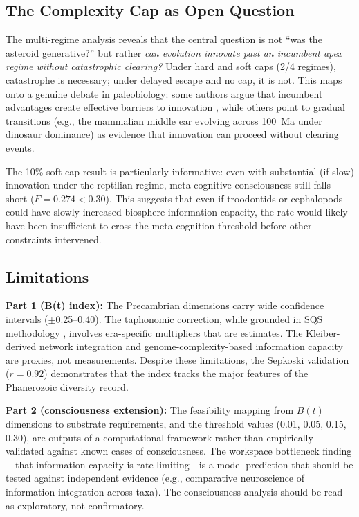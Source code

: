 \documentclass[10pt,letterpaper]{article}
\newcommand{\bt}{$B(t)$}
\begin{document}
\subsection*{The Complexity Cap as Open Question}

The multi-regime analysis reveals that the central question is not ``was
the asteroid generative?'' but rather \emph{can evolution innovate past an
incumbent apex regime without catastrophic clearing?} Under hard and soft
caps (2/4 regimes), catastrophe is necessary; under delayed escape and no
cap, it is not. This maps onto a genuine debate in paleobiology: some authors
argue that incumbent advantages create effective barriers to innovation
\cite{erwin2001}, while others point to gradual transitions (e.g., the
mammalian middle ear evolving across 100~Ma under dinosaur dominance) as
evidence that innovation can proceed without clearing events.

The 10\% soft cap result is particularly informative: even with substantial
(if slow) innovation under the reptilian regime, meta-cognitive consciousness
still falls short ($F = 0.274 < 0.30$). This suggests that even if troodontids
or cephalopods could have slowly increased biosphere information capacity,
the rate would likely have been insufficient to cross the meta-cognition
threshold before other constraints intervened.

\subsection*{Limitations}

\textbf{Part 1 (B(t) index):} The Precambrian dimensions carry wide
confidence intervals ($\pm$0.25--0.40). The taphonomic correction,
while grounded in SQS methodology \cite{alroy2010}, involves era-specific
multipliers that are estimates. The Kleiber-derived network integration
and genome-complexity-based information capacity are proxies, not measurements.
Despite these limitations, the Sepkoski validation ($r = 0.92$) demonstrates
that the index tracks the major features of the Phanerozoic diversity record.

\textbf{Part 2 (consciousness extension):} The feasibility mapping from
\bt{} dimensions to substrate requirements, and the threshold values
(0.01, 0.05, 0.15, 0.30), are outputs of a computational framework rather
than empirically validated against known cases of consciousness. The workspace
bottleneck finding---that information capacity is rate-limiting---is a
model prediction that should be tested against independent evidence (e.g.,
comparative neuroscience of information integration across taxa).
The consciousness analysis should be read as exploratory, not confirmatory.
\end{document}
